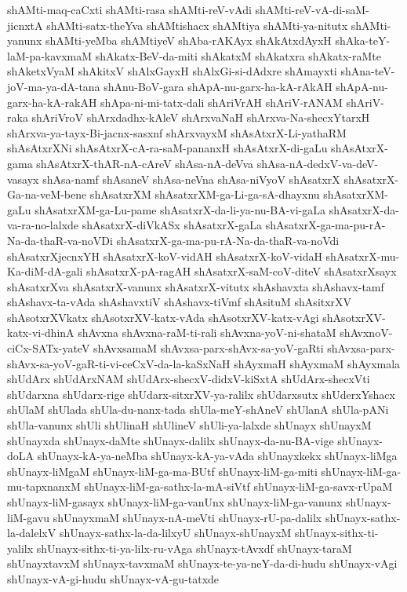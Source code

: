 {shAMti-maq-caCxti
shAMti-rasa
shAMti-reV-vAdi
shAMti-reV-vA-di-saM-jicnxtA
shAMti-satx-theYva
shAMtishacx
shAMtiya
shAMti-ya-nitutx
shAMti-yanunx
shAMti-yeMba
shAMtiyeV
shAba-rAKAyx
shAkAtxdAyxH
shAka-teY-laM-pa-kavxmaM
shAkatx-BeV-da-miti
shAkatxM
shAkatxra
shAkatx-raMte
shAketxVyaM
shAkitxV
shAlxGayxH
shAlxGi-si-dAdxre
shAmayxti
shAna-teV-joV-ma-ya-dA-tana
shAnu-BoV-gara
shApA-nu-garx-ha-kA-rAkAH
shApA-nu-garx-ha-kA-rakAH
shApa-ni-mi-tatx-dali
shAriVrAH
shAriV-rANAM
shAriV-raka
shAriVroV
shArxdadhx-kAleV
shArxvaNaH
shArxva-Na-shecxYtarxH
shArxva-ya-tayx-Bi-jacnx-sasxnf
shArxvayxM
shAsAtxrX-Li-yathaRM
shAsAtxrXNi
shAsAtxrX-cA-ra-saM-pananxH
shAsAtxrX-di-gaLu
shAsAtxrX-gama
shAsAtxrX-thAR-nA-cAreV
shAsa-nA-deVva
shAsa-nA-dedxV-va-deV-vasayx
shAsa-namf
shAsaneV
shAsa-neVna
shAsa-niVyoV
shAsatxrX
shAsatxrX-Ga-na-veM-bene
shAsatxrXM
shAsatxrXM-ga-Li-ga-sA-dhayxnu
shAsatxrXM-gaLu
shAsatxrXM-ga-Lu-pame
shAsatxrX-da-li-ya-nu-BA-vi-gaLa
shAsatxrX-da-va-ra-no-lalxde
shAsatxrX-diVkASx
shAsatxrX-gaLa
shAsatxrX-ga-ma-pu-rA-Na-da-thaR-va-noVDi
shAsatxrX-ga-ma-pu-rA-Na-da-thaR-va-noVdi
shAsatxrXjecnxYH
shAsatxrX-koV-vidAH
shAsatxrX-koV-vidaH
shAsatxrX-mu-Ka-diM-dA-gali
shAsatxrX-pA-ragAH
shAsatxrX-saM-coV-diteV
shAsatxrXsayx
shAsatxrXva
shAsatxrX-vanunx
shAsatxrX-vitutx
shAshavxta
shAshavx-tamf
shAshavx-ta-vAda
shAshavxtiV
shAshavx-tiVmf
shAsituM
shAsitxrXV
shAsotxrXVkatx
shAsotxrXV-katx-vAda
shAsotxrXV-katx-vAgi
shAsotxrXV-katx-vi-dhinA
shAvxna
shAvxna-raM-ti-rali
shAvxna-yoV-ni-shataM
shAvxnoV-ciCx-SATx-yateV
shAvxsamaM
shAvxsa-parx-shAvx-sa-yoV-gaRti
shAvxsa-parx-shAvx-sa-yoV-gaR-ti-vi-ceCxV-da-la-kaSxNaH
shAyxmaH
shAyxmaM
shAyxmala
shUdArx
shUdArxNAM
shUdArx-shecxV-didxV-kiSxtA
shUdArx-shecxVti
shUdarxna
shUdarx-rige
shUdarx-sitxrXV-ya-ralilx
shUdarxsutx
shUderxYshacx
shUlaM
shUlada
shUla-du-nanx-tada
shUla-meY-shAneV
shUlanA
shUla-pANi
shUla-vanunx
shUli
shUlinaH
shUlineV
shUli-ya-lalxde
shUnayx
shUnayxM
shUnayxda
shUnayx-daMte
shUnayx-dalilx
shUnayx-da-nu-BA-vige
shUnayx-doLA
shUnayx-kA-ya-neMba
shUnayx-kA-ya-vAda
shUnayxkekx
shUnayx-liMga
shUnayx-liMgaM
shUnayx-liM-ga-ma-BUtf
shUnayx-liM-ga-miti
shUnayx-liM-ga-mu-tapxnanxM
shUnayx-liM-ga-sathx-la-mA-siVtf
shUnayx-liM-ga-savx-rUpaM
shUnayx-liM-gasayx
shUnayx-liM-ga-vanUnx
shUnayx-liM-ga-vanunx
shUnayx-liM-gavu
shUnayxmaM
shUnayx-nA-meVti
shUnayx-rU-pa-dalilx
shUnayx-sathx-la-dalelxV
shUnayx-sathx-la-da-lilxyU
shUnayx-shUnayxM
shUnayx-sithx-ti-yalilx
shUnayx-sithx-ti-ya-lilx-ru-vAga
shUnayx-tAvxdf
shUnayx-taraM
shUnayxtavxM
shUnayx-tavxmaM
shUnayx-te-ya-neY-da-di-hudu
shUnayx-vAgi
shUnayx-vA-gi-hudu
shUnayx-vA-gu-tatxde
}
